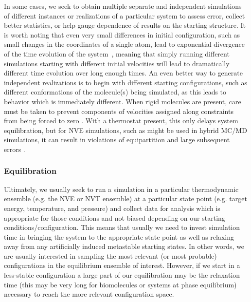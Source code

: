 \documentclass[9pt,bestpractices]{livecoms}
\begin{document}
In some cases, we seek to obtain multiple separate and independent simulations of different instances or realizations of a particular system to assess error, collect better statistics, or help gauge dependence of results on the starting structure.
It is worth noting that even very small differences in initial configuration, such as small changes in the coordinates of a single atom, lead to exponential divergence of the time evolution of the system~\cite{allen_computer_2017}, meaning that simply running different simulations starting with different initial velocities will lead to dramatically different time evolution over long enough times.
An even better way to generate independent realizations is to begin with different starting configurations, such as different conformations of the molecule(s) being simulated, as this leads to behavior which is immediately different.
When rigid molecules are present, care must be taken to prevent components of velocities assigned along constraints from being forced to zero \citep{Joswiak2013}.
With a thermostat present, this only delays system equilibration, but for NVE simulations, such as might be used in hybrid MC/MD simulations, it can result in violations of equipartition and large subsequent errors \citep{Palmer2018}.

\subsubsection{Equilibration}

Ultimately, we usually seek to run a simulation in a particular thermodynamic ensemble (e.g. the NVE or NVT ensemble) at a particular state point (e.g. target energy, temperature, and pressure) and collect data for analysis which is appropriate for those conditions and not biased depending on our starting conditions/configuration.
This means that usually we need to invest simulation time in bringing the system to the appropriate state point as well as relaxing away from any artificially induced metastable starting states.
In other words, we are usually interested in sampling the most relevant (or most probable) configurations in the equilibrium ensemble of interest.
However, if we start in a less-stable configuration a large part of our equilibration may be the relaxation time (this may be very long for biomolecules or systems at phase equilibrium) necessary to reach the more relevant configuration space.
\end{document}
